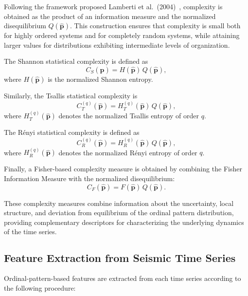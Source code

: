 \documentclass[12pt,a4paper]{article}
\begin{document}
Following the framework proposed Lamberti et al.~(2004)~\cite{lamberti2004intensive}, complexity is obtained as the product of an information measure and the normalized disequilibrium \(Q(\widehat{\mathbf p})\). This construction ensures that complexity is small both for highly ordered systems and for completely random systems, while attaining larger values for distributions exhibiting intermediate levels of organization.

The Shannon statistical complexity is defined as
\[
C_S(\widehat{\mathbf p})
=
H(\widehat{\mathbf p})
\,Q(\widehat{\mathbf p}),
\]
where \(H(\widehat{\mathbf p})\) is the normalized Shannon entropy.

Similarly, the Tsallis statistical complexity is
\[
C_T^{(q)}(\widehat{\mathbf p})
=
H_T^{(q)}(\widehat{\mathbf p})
\,Q(\widehat{\mathbf p}),
\]
where \(H_T^{(q)}(\widehat{\mathbf p})\) denotes the normalized Tsallis
entropy of order \(q\).

The Rényi statistical complexity is defined as
\[
C_R^{(q)}(\widehat{\mathbf p})
=
H_R^{(q)}(\widehat{\mathbf p})
\,Q(\widehat{\mathbf p}),
\]
where \(H_R^{(q)}(\widehat{\mathbf p})\) denotes the normalized Rényi
entropy of order \(q\).

Finally, a Fisher-based complexity measure is obtained by combining the Fisher Information Measure with the normalized disequilibrium:
\[
C_F(\widehat{\mathbf p})
=
F(\widehat{\mathbf p})
\,Q(\widehat{\mathbf p}).
\]

These complexity measures combine information about the uncertainty, local structure, and deviation from equilibrium of the ordinal pattern distribution, providing complementary descriptors for characterizing the underlying dynamics of the time series.


\subsection{Feature Extraction from Seismic Time Series}\label{feature_extraction}

Ordinal-pattern-based features are extracted from each time series according to the following procedure:
\end{document}
